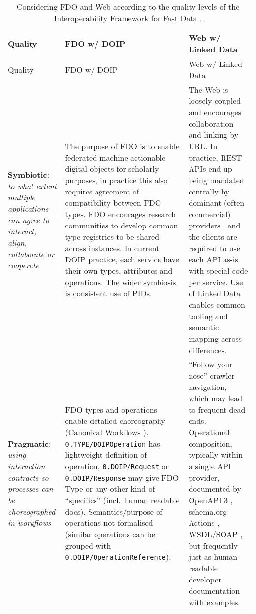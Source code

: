 \renewcommand*{\arraystretch}{1.4}
\begin{longtable}[]{@{}
  >{\raggedright\arraybackslash}p{}
  >{\arraybackslash}p{}
  >{\arraybackslash}p{}@{}}
\caption[Considering FDO and Web according to Interoperability Framework for Fast Data]{Considering FDO and Web according to the quality levels of the Interoperability Framework for Fast Data \cite{delgadoInteroperabilityFrameworkDistributed2016a}.
\label{ch3:fdo-web-interoperability-framework}}\tabularnewline
\toprule
Quality & 
FDO w/ DOIP & 
Web w/ Linked Data \\
\midrule
\endfirsthead
\toprule
Quality &
FDO w/ DOIP & 
Web w/ Linked Data \\
\midrule
\endhead
\textbf{Symbiotic}: \emph{to what extent multiple applications can agree to interact, align, collaborate or cooperate}
  & The purpose of FDO is to enable federated machine actionable digital objects for scholarly purposes, in practice this also requires agreement of compatibility between FDO types. FDO encourages research communities to develop common type registries to be shared across instances. In current DOIP practice, each service have their own types, attributes and operations. The wider symbiosis is consistent use of PIDs.
  & The Web is loosely coupled and encourages collaboration and linking by URL. In practice, REST APIs \cite{fieldingArchitecturalStylesDesign2000a} end up being mandated centrally by dominant (often commercial) providers \cite{fieldingReflectionsRESTArchitectural2017a}, and the clients are required to use each API as-is with special code per service. Use of Linked Data enables common tooling and semantic mapping across differences. \\
\textbf{Pragmatic}: \emph{using interaction contracts so processes can be choreographed in workflows}
  & FDO types and operations enable detailed choreography (Canonical Workflows \cite{cwfr}). \texttt{0.TYPE/DOIPOperation} has lightweight definition of operation, \texttt{0.DOIP/Request} or \texttt{0.DOIP/Response} may give FDO Type or any other kind of ``specifics'' (incl.~human readable docs). Semantics/purpose of operations not formalised (similar operations can be grouped with \texttt{0.DOIP/OperationReference}).
  & ``Follow your nose'' crawler navigation, which may lead to frequent dead ends. Operational composition, typically within a single API provider, documented by OpenAPI 3 \cite{OpenAPISpecificationV3}, schema.org Actions \cite{SchemaOrgActions}, WSDL/SOAP \cite{w3-wsdl20-primer}, but frequently just as human-readable developer documentation with examples. \\

\end{longtable}
